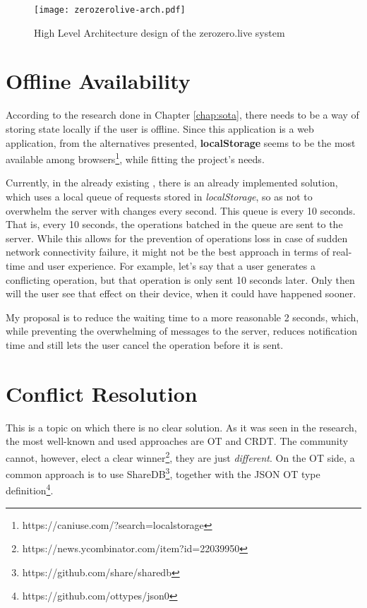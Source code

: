 \begin{figure}[t]
    \begin{center}
        \leavevmode
        \texttt{[image: zerozerolive-arch.pdf]}
        \caption{High Level Architecture design of the zerozero.live system}
        \label{fig:high-level-arch}
    \end{center}
\end{figure}

\section{Offline Availability} \label{sec:prob-solution-offline-avail}
According to the research done in Chapter \ref{chap:sota}, there needs to be a way of storing state locally if the user is offline. Since this application is a web application, from the alternatives presented, \textbf{localStorage} seems to be the most available among browsers\footnote{https://caniuse.com/?search=localstorage}, while fitting the project's needs. 

Currently, in the already existing , there is an already implemented solution, which uses a local queue of requests stored in \textit{localStorage}, so as not to overwhelm the server with changes every second. This queue is  every 10 seconds. That is, every 10 seconds, the operations batched in the queue are sent to the server. While this allows for the prevention of operations loss in case of sudden network connectivity failure, it might not be the best approach in terms of real-time and user experience. For example, let's say that a user generates a conflicting operation, but that operation is only sent 10 seconds later. Only then will the user see that effect on their device, when it could have happened sooner.

My proposal is to reduce the waiting time to a more reasonable 2 seconds, which, while preventing the overwhelming of messages to the server, reduces notification time and still lets the user cancel the operation before it is sent.

\section{Conflict Resolution} \label{sec:prob-solution-conflict-res}
This is a topic on which there is no clear solution. As it was seen in the research, the most well-known and used approaches are OT and CRDT. The community cannot, however, elect a clear winner\footnote{https://news.ycombinator.com/item?id=22039950}, they are just \textit{different}. On the OT side, a common approach is to use ShareDB\footnote{https://github.com/share/sharedb}, together with the JSON OT type definition\footnote{https://github.com/ottypes/json0}.

